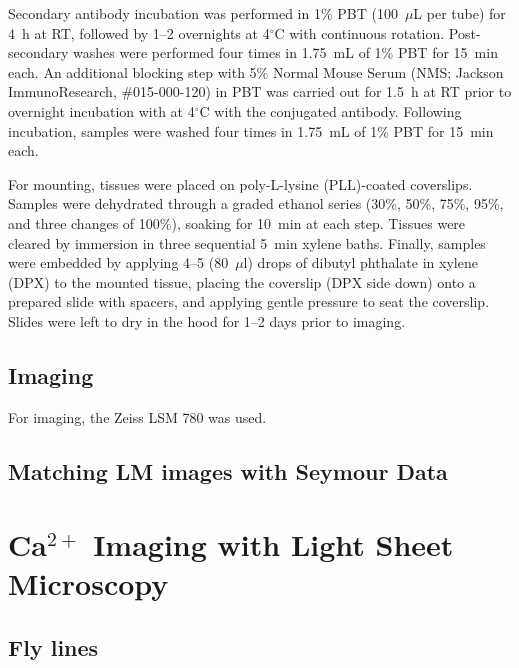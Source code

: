     Secondary antibody incubation was performed in 1\% PBT (100~$\mu$L per tube) for 4~h at RT, followed by 1--2 overnights at 4$^\circ$C with continuous rotation. Post-secondary washes were performed four times in 1.75~mL of 1\% PBT for 15~min each. An additional blocking step with 5\% Normal Mouse Serum (NMS; Jackson ImmunoResearch, \#015-000-120) in PBT was carried out for 1.5~h at RT prior to overnight incubation with at 4$^\circ$C with the conjugated antibody. Following incubation, samples were washed four times in 1.75~mL of 1\% PBT for 15~min each.  

    For mounting, tissues were placed on poly-L-lysine (PLL)-coated coverslips. Samples were dehydrated through a graded ethanol series (30\%, 50\%, 75\%, 95\%, and three changes of 100\%), soaking for 10~min at each step. Tissues were cleared by immersion in three sequential 5~min xylene baths. Finally, samples were embedded by applying 4--5 (80~$\mu$l) drops of dibutyl phthalate in xylene (DPX) to the mounted tissue, placing the coverslip (DPX side down) onto a prepared slide with spacers, and applying gentle pressure to seat the coverslip. Slides were left to dry in the hood for 1--2 days prior to imaging.

\subsection{Imaging}
    For imaging, the Zeiss LSM 780 was used.

\subsection{Matching LM images with Seymour Data} %










\section{Ca$^{2+}$ Imaging with Light Sheet Microscopy}

\subsection{Fly lines} %

